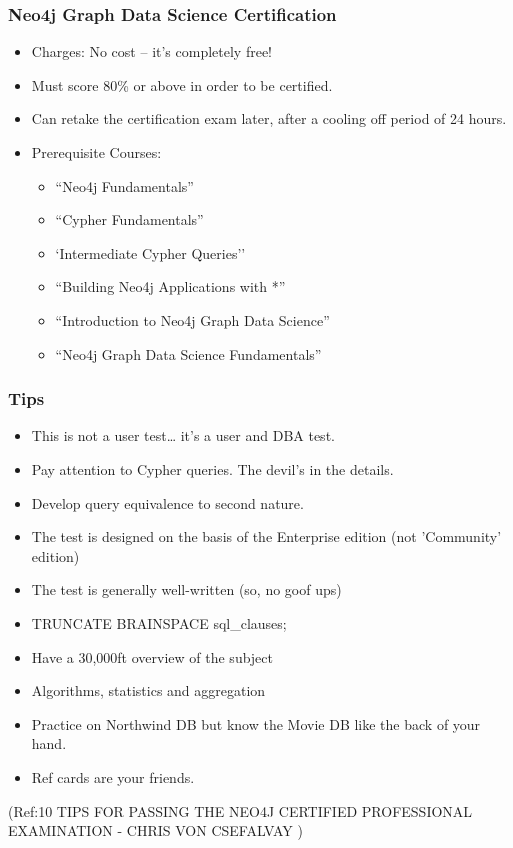 \begin{frame}\frametitle{Neo4j Graph Data Science  Certification}
\begin{itemize}
\item Charges: No cost – it’s completely free!
\item Must score 80\% or above in order to be certified.
\item Can retake the certification exam later, after a cooling off period of 24 hours.
\item Prerequisite Courses:
	\begin{itemize}
	\item ``Neo4j Fundamentals''
	\item ``Cypher Fundamentals''
	\item `Intermediate Cypher Queries''
	\item ``Building Neo4j Applications with *''
	\item ``Introduction to Neo4j Graph Data Science''
	\item ``Neo4j Graph Data Science Fundamentals''
	\end{itemize}
\end{itemize}
\end{frame}

\begin{frame}\frametitle{Tips}
\begin{itemize}
\item This is not a user test… it’s a user and DBA test.
\item  Pay attention to Cypher queries. The devil’s in the details.
\item Develop query equivalence to second nature.
\item The test is designed on the basis of the Enterprise edition (not 'Community' edition)
\item The test is generally well-written (so, no goof ups)
\item TRUNCATE BRAINSPACE sql\_clauses;
\item Have a 30,000ft overview of the subject
\item Algorithms, statistics and aggregation
\item Practice on Northwind DB but know the Movie DB like the back of your hand.
\item  Ref cards are your friends.
\end{itemize}

{\tiny (Ref:10 TIPS FOR PASSING THE NEO4J CERTIFIED PROFESSIONAL EXAMINATION
- CHRIS VON CSEFALVAY )}

\end{frame}


